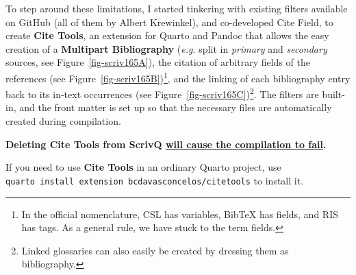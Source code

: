 \documentclass[
  12pt,
  a4paper,
  oneside,
  numbers=noenddot,
  titlepage,
  toclink=all,
  toc=bibliography]{scrbook}
\theoremstyle{definition}
\theoremstyle{definition}
\theoremstyle{definition}
\theoremstyle{plain}
\theoremstyle{plain}
\theoremstyle{plain}
\theoremstyle{plain}
\theoremstyle{plain}
\theoremstyle{remark}
\begin{document}
To step around these limitations, I started tinkering with existing
filters available on GitHub (all of them by Albert Krewinkel), and
co-developed Cite Field, to create \textbf{Cite Tools}, an extension for
Quarto and Pandoc that allows the easy creation of a \textbf{Multipart
Bibliography} (\emph{e.g.} split in \emph{primary} and \emph{secondary}
sources, see
\protect\hypertarget{cite_92}{}{\label{cite_92}Figure~\ref{fig-scriv165A}}),
the citation of arbitrary fields of the references (see
\protect\hypertarget{cite_93}{}{\label{cite_93}Figure~\ref{fig-scriv165B}})\footnote{In
  the official nomenclature, CSL has variables, BibTeX has fields, and
  RIS has tags. As a general rule, we have stuck to the term fields.},
and the linking of each bibliography entry back to its in-text
occurrences (see
\protect\hypertarget{cite_94}{}{\label{cite_94}Figure~\ref{fig-scriv165C}})\footnote{Linked
  glossaries can also easily be created by dressing them as
  bibliography.}. The filters are built-in, and the front matter is set
up so that the necessary files are automatically created during
compilation.

\begin{tcolorbox}[enhanced jigsaw, arc=.35mm, left=2mm, colframe=quarto-callout-warning-color-frame, bottomrule=.15mm, toprule=.15mm, colback=white, breakable, opacityback=0, rightrule=.15mm, leftrule=.75mm]
\begin{minipage}[t]{5.5mm}
\textcolor{quarto-callout-warning-color}{\faExclamationTriangle}
\end{minipage}%
\begin{minipage}[t]{\textwidth - 5.5mm}

\textbf{Deleting Cite Tools from ScrivQ \ul{will cause the compilation
to fail}.}\vspace{2mm}

\end{minipage}%
\end{tcolorbox}

\begin{tcolorbox}[enhanced jigsaw, arc=.35mm, left=2mm, colframe=quarto-callout-tip-color-frame, bottomrule=.15mm, toprule=.15mm, colback=white, breakable, opacityback=0, rightrule=.15mm, leftrule=.75mm]
\begin{minipage}[t]{5.5mm}
\textcolor{quarto-callout-tip-color}{\faLightbulb}
\end{minipage}%
\begin{minipage}[t]{\textwidth - 5.5mm}

If you need to use \textbf{Cite Tools }in an ordinary Quarto project,
use \texttt{quarto\ install\ extension\ bcdavasconcelos/citetools} to
install it.

\end{minipage}%
\end{tcolorbox}
\end{document}
